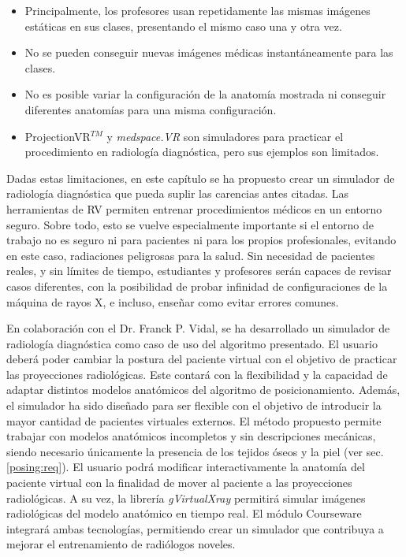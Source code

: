 \begin{itemize}
\item Principalmente, los profesores usan repetidamente las mismas imágenes estáticas en sus clases, presentando el mismo caso una y otra vez.
\item No se pueden conseguir nuevas imágenes médicas instantáneamente para las clases.
\item No es posible variar la configuración de la anatomía mostrada ni conseguir diferentes anatomías para una misma configuración.
\item ProjectionVR$^{TM}$\cite{shanahan2016student} y \emph{medspace.VR} \cite{medspace} son simuladores para practicar el procedimiento en radiología diagnóstica, pero sus ejemplos son limitados.
\end{itemize}

Dadas estas limitaciones, en este capítulo se ha propuesto crear un simulador de radiología diagnóstica que pueda suplir las carencias antes citadas. Las herramientas de \ac{RV} permiten entrenar procedimientos médicos en un entorno seguro. Sobre todo, esto se vuelve especialmente importante si el entorno de trabajo no es seguro ni para pacientes ni para los propios profesionales, evitando en este caso, radiaciones peligrosas para la salud. Sin necesidad de pacientes reales, y sin límites de tiempo, estudiantes y profesores serán capaces de revisar casos diferentes, con la posibilidad de probar infinidad de configuraciones de la máquina de rayos X, e incluso, enseñar como evitar errores comunes.%




En colaboración con el Dr. Franck P. Vidal, se ha desarrollado un simulador de radiología diagnóstica como caso de uso del algoritmo presentado.  El usuario deberá poder cambiar la postura del paciente virtual con el objetivo de practicar las proyecciones radiológicas.
Este contará con la flexibilidad y la capacidad de %
adaptar distintos modelos anatómicos del algoritmo de posicionamiento.
Además, el simulador ha sido diseñado para ser flexible con el objetivo de introducir la mayor cantidad de pacientes virtuales externos. El método propuesto permite trabajar con modelos anatómicos incompletos y sin descripciones mecánicas, siendo necesario únicamente la presencia de los tejidos óseos y la piel (ver sec. \ref{posing:req}). El usuario podrá modificar interactivamente la anatomía del paciente virtual con la finalidad de mover al paciente a las proyecciones radiológicas. %
A su vez, la librería \emph{gVirtualXray} \cite{sujar:hal}  permitirá simular imágenes radiológicas del modelo anatómico en tiempo real. El módulo \ac{Courseware} integrará ambas tecnologías, permitiendo crear un simulador que contribuya a mejorar el entrenamiento de radiólogos noveles.


